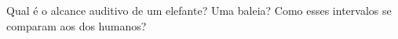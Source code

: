 Qual é o alcance auditivo de um elefante? Uma baleia? Como esses intervalos se comparam aos dos humanos?

